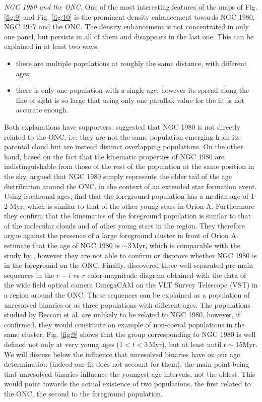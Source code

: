 \documentclass[twocolumn]{aa}
\begin{document}
\textit{NGC 1980 and the ONC.} One of the most interesting features of the maps of Fig. \ref{fig:9} and Fig. \ref{fig:10} is the prominent density enhancement towards NGC 1980, NGC 1977 and the ONC. The density enhancement is not concentrated in only one panel, but persists in all of them and disappears in the last one. This can be explained in at least two ways:
\begin{itemize} 
\item there are multiple populations at roughly the same distance, with different ages; 
\item there is only one population with a single age, however its spread along the line of sight is so large that using only one parallax value for the fit is not accurate enough.
\end{itemize}
Both explanations have supporters. 
\cite{Alves2012} suggested that NGC 1980 is not directly related to the ONC, i.e. they are not the same population emerging from its parental cloud but are instead distinct overlapping populations. On the other hand, based on the fact that the kinematic properties of NGC 1980 are indistinguishable from those of the rest of the population at the same position in the sky, \cite{DaRio2016} argued that NGC 1980 simply represents the older tail of the age distribution around the ONC, in the context of an extended star formation event. Using isochronal ages, \citet{Fang2017} find that the foreground population has a median age of 1-2 Myr, which is similar to that of the other young stars in Orion A. Furthermore they confirm that the kinematics of the foreground population is similar to that of the molecular clouds and of other young stars in the region. They therefore argue against the presence of a large foreground cluster in front of Orion A. \cite{Kounkel2017b} estimate that the age of NGC 1980 is $\sim 3 \, \mathrm{Myr}$, which is comparable with the study by \citet{Fang2017}, however they are not able to confirm or disprove whether NGC 1980 is in the foreground on the ONC. 
Finally, \citet{Beccari2017} discovered three well-separated pre-main sequences in the $r-i$ vs $r$ color-magnitude diagram obtained with the data of the wide field optical camera OmegaCAM on the VLT Survey Telescope (VST) in a region around the ONC. These sequences can be explained as a population of unresolved binaries or as three populations with different ages. The populations studied by Beccari et al. are unlikely to be related to NGC 1980, however, if confirmed, they would constitute an example of non-coeval populations in the same cluster.
Fig. \ref{fig:9} shows that the group corresponding to NGC 1980 is well defined not only at very young ages ($1 < t < 3 \, \mathrm{Myr}$), but at least until $t \sim 15 \mathrm{Myr}$. We will discuss below the influence that unresolved binaries have on our age determination (indeed our fit does not account for them), the main point being that unresolved binaries influence the youngest age intervals, not the oldest. This would point towards the actual existence of two populations, the first related to the ONC, the second to the \cite{Alves2012} foreground population. 
\end{document}
